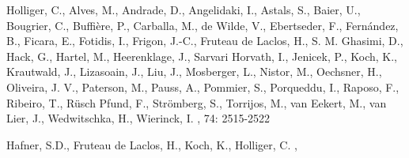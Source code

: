 \documentclass[]{article}
\begin{document}
\begin{thebibliography}{1}

Holliger, C., Alves, M., Andrade, D., Angelidaki, I., Astals, S., Baier, U., Bougrier, C., Buffi{\`e}re, P., Carballa, M., de Wilde, V., Ebertseder, F., Fern{\'a}ndez, B., Ficara, E., Fotidis, I., Frigon, J.-C., Fruteau de Laclos, H., S. M. Ghasimi, D., Hack, G., Hartel, M., Heerenklage, J., Sarvari Horvath, I., Jenicek, P., Koch, K., Krautwald, J., Lizasoain, J., Liu, J., Mosberger, L., Nistor, M., Oechsner, H., Oliveira, J. V., Paterson, M., Pauss, A., Pommier, S., Porqueddu, I., Raposo, F., Ribeiro, T., R{\"u}sch Pfund, F., Str{\"o}mberg, S., Torrijos, M., van Eekert, M., van Lier, J., Wedwitschka, H., Wierinck, I.
,
 74: 2515-2522

  Hafner, S.D., Fruteau de Laclos, H., Koch, K., Holliger, C.
    ,

\end{thebibliography}
\end{document}
